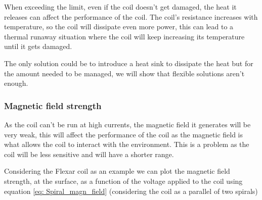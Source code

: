 When exceeding the limit, even if the coil doesn't get damaged, the heat it releases can affect the performance of the coil. The coil's resistance increases with temperature, so the coil will dissipate even more power, this can lead to a thermal runaway situation where the coil will keep increasing its temperature until it gets damaged.

The only solution could be to introduce a heat sink to dissipate the heat but for the amount needed to be managed, we will show that flexible solutions aren't enough.

\subsubsection{Magnetic field strength}
As the coil can't be run at high currents, the magnetic field it generates will be very weak, this will affect the performance of the coil as the magnetic field is what allows the coil to interact with the environment. This is a problem as the coil will be less sensitive and will have a shorter range.

Considering the Flexar coil as an example we can plot the magnetic field strength, at the surface, as a function of the voltage applied to the coil using equation \eqref{eq: Spiral_magn_field} (considering the coil as a parallel of two spirals)

\begin{center}
\end{center}

